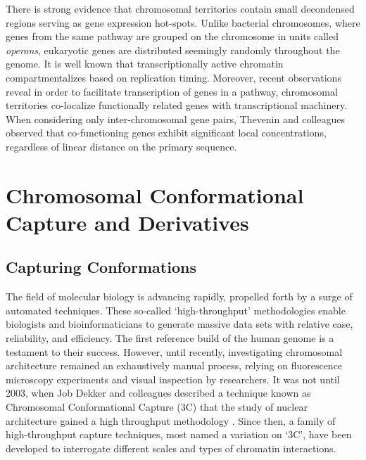 \documentclass[phd,tocprelim]{cornell}
\begin{document}
There is strong evidence that chromosomal territories contain small decondensed regions serving as gene
expression hot-spots.  Unlike bacterial chromosomes, where genes from the same pathway are grouped on the
chromosome in units called \textit{operons}, eukaryotic genes are distributed seemingly randomly throughout
the genome\cite{jacob1961}.  It is well known that transcriptionally active chromatin compartmentalizes based
on replication timing\cite{ferreira1997}\cite{sadoni1999}\cite{thevenin2014}.  Moreover, recent observations
reveal in order to facilitate transcription of genes in a pathway, chromosomal territories co-localize
functionally related genes with transcriptional machinery.  When considering only inter-chromosomal gene pairs,
Thevenin and colleagues observed that co-functioning genes exhibit significant local concentrations, regardless
of linear distance on the primary sequence\cite{thevenin2014}.



\chapter{Chromosomal Conformational Capture and Derivatives}

\section{Capturing Conformations}

The field of molecular biology is advancing rapidly, propelled forth by a
surge of automated techniques.  These so-called `high-throughput' methodologies
enable biologists and bioinformaticians to generate massive data sets with
relative ease, reliability, and efficiency.  The first reference build of the
human genome is a testament to their success\cite{hgsc2004}.  However,
until recently, investigating chromosomal architecture remained an
exhaustively manual process, relying on fluorescence microscopy experiments and
visual inspection by researchers.  It was not until 2003, when Job Dekker and
colleagues described a technique known as Chromosomal Conformational Capture
(3C) that the study of nuclear architecture gained a high throughput methodology
\cite{dekker2002}. Since then, a family of high-throughput capture techniques,
most named a variation on `3C', have been developed to interrogate
different scales and types of chromatin interactions.
\end{document}

